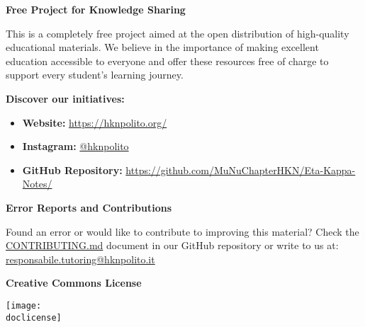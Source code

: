     \vspace{0.3cm}
    {\large\textbf{Free Project for Knowledge Sharing}}
    \par
    This is a completely free project aimed at the open distribution of high-quality educational materials. We believe in the importance of making excellent education accessible to everyone and offer these resources free of charge to support every student's learning journey.

    \vspace{0.3cm}
    {\large\textbf{Discover our initiatives:}}
    \par
    \begin{itemize}[topsep=0pt,itemsep=0pt,parsep=0pt,partopsep=0pt]
        \item \textbf{Website:} \href{https://hknpolito.org/}{https://hknpolito.org/}
        \item \textbf{Instagram:} \href{https://www.instagram.com/hknpolito/}{@hknpolito}
        \item \textbf{GitHub Repository:} \href{https://github.com/MuNuChapterHKN/Eta-Kappa-Notes/}{https://github.com/MuNuChapterHKN/Eta-Kappa-Notes/}
    \end{itemize}

    \vspace{0.3cm}
    \textbf{Error Reports and Contributions}
    \par
    Found an error or would like to contribute to improving this material? Check the \href{https://github.com/MuNuChapterHKN/Eta-Kappa-Notes/blob/main/CONTRIBUTING.md}{CONTRIBUTING.md} document in our GitHub repository or write to us at: \href{mailto:responsabile.tutoring@hknpolito.it}{responsabile.tutoring@hknpolito.it}

    \vfill

    \begin{center}
        \begin{minipage}{\linewidth}
            \begin{minipage}{0.6\textwidth}
                {\Large\textbf{Creative Commons License}}
            \end{minipage}
            \begin{minipage}{0.39\linewidth}
                \raggedleft
                \texttt{[image: \\doclicense]}
            \end{minipage}
        \end{minipage}
    \end{center}

